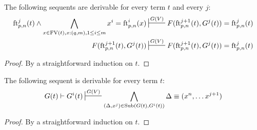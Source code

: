 \documentclass[reqno]{amsart}
\theoremstyle{definition}
\theoremstyle{remark}
\newcommand{\fs}[1]{\mathrm{#1}}
\newcommand{\FV}{\fs{FV}}
\newcommand{\ft}{\fs{ft}}
\newcommand{\sub}{\fs{Sub}}
\numberwithin{figure}{section}
\begin{document}
\begin{lem}
The following sequents are derivable for every term $t$ and every $j$:
\begin{align*}
\ft^j_{p,n}(t) \land \bigwedge_{x \in \FV(t), x : (q,m), 1 \leq i \leq m} x^i = \ft^i_{p,n}(x) & \sststile{}{G(V)} F(\ft^{j+1}_{p,n}(t), G^j(t)) = \ft^j_{p,n}(t) \\
F(\ft^{j+1}_{p,n}(t), G^j(t)) & \sststile{}{G(V)} F(\ft^{j+1}_{p,n}(t), G^j(t)) = \ft^j_{p,n}(t)
\end{align*}
\end{lem}
\begin{proof}
By a straightforward induction on $t$.
\end{proof}

\begin{lem}
The following sequent is derivable for every term $t$:
\[ G(t) \vdash G^i(t) \sststile{}{G(V)} \bigwedge_{(\Delta,x^j) \in \sub(G(t),G^i(t))} \Delta \equiv (x^n, \ldots x^{j+1}) \]
\end{lem}
\begin{proof}
By a straightforward induction on $t$.
\end{proof}
\end{document}

